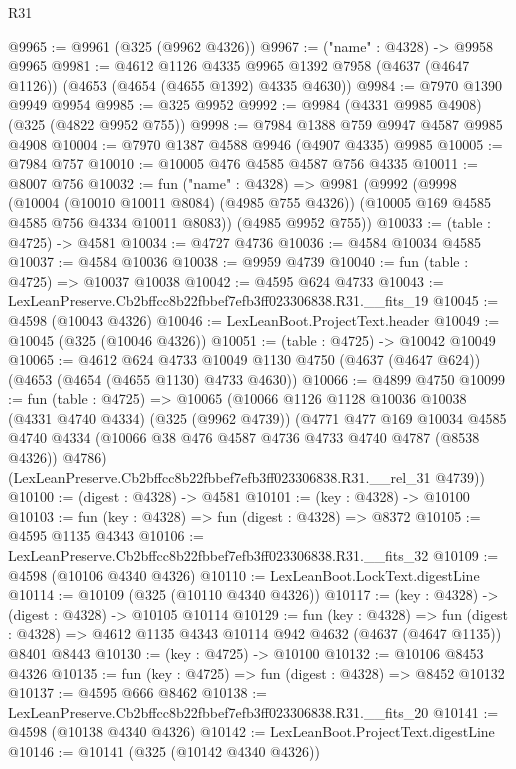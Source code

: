 \begin{lexlean}{R31}
\begin{coremodule}
@9965 := @9961 (@325 (@9962 @4326))
@9967 := ("name" : @4328) -> @9958 @9965
@9981 := @4612
    @1126
    @4335
    @9965
    @1392
    @7958
    (@4637 (@4647 @1126))
    (@4653 (@4654 (@4655 @1392) @4335 @4630))
@9984 := @7970 @1390 @9949 @9954
@9985 := @325 @9952
@9992 := @9984 (@4331 @9985 @4908) (@325 (@4822 @9952 @755))
@9998 := @7984 @1388 @759 @9947 @4587 @9985 @4908
@10004 := @7970 @1387 @4588 @9946 (@4907 @4335) @9985
@10005 := @7984 @757
@10010 := @10005 @476 @4585 @4587 @756 @4335
@10011 := @8007 @756
@10032 := fun ("name" : @4328) =>
  @9981
    (@9992
      (@9998
        (@10004 (@10010 @10011 @8084) (@4985 @755 @4326))
        (@10005 @169 @4585 @4585 @756 @4334 @10011 @8083))
      (@4985 @9952 @755))
@10033 := (table : @4725) -> @4581
@10034 := @4727 @4736
@10036 := @4584 @10034 @4585
@10037 := @4584 @10036
@10038 := @9959 @4739
@10040 := fun (table : @4725) => @10037 @10038
@10042 := @4595 @624 @4733
@10043 := LexLeanPreserve.Cb2bffcc8b22fbbef7efb3ff023306838.R31.__fits_19
@10045 := @4598 (@10043 @4326)
@10046 := LexLeanBoot.ProjectText.header
@10049 := @10045 (@325 (@10046 @4326))
@10051 := (table : @4725) -> @10042 @10049
@10065 := @4612
    @624
    @4733
    @10049
    @1130
    @4750
    (@4637 (@4647 @624))
    (@4653 (@4654 (@4655 @1130) @4733 @4630))
@10066 := @4899 @4750
@10099 := fun (table : @4725) =>
  @10065
    (@10066
      @1126
      @1128
      @10036
      @10038
      (@4331 @4740 @4334)
      (@325 (@9962 @4739))
      (@4771
        @477
        @169
        @10034
        @4585
        @4740
        @4334
        (@10066 @38 @476 @4587 @4736 @4733 @4740 @4787 (@8538 @4326))
        @4786)
      (LexLeanPreserve.Cb2bffcc8b22fbbef7efb3ff023306838.R31.__rel_31 @4739))
@10100 := (digest : @4328) -> @4581
@10101 := (key : @4328) -> @10100
@10103 := fun (key : @4328) => fun (digest : @4328) => @8372
@10105 := @4595 @1135 @4343
@10106 := LexLeanPreserve.Cb2bffcc8b22fbbef7efb3ff023306838.R31.__fits_32
@10109 := @4598 (@10106 @4340 @4326)
@10110 := LexLeanBoot.LockText.digestLine
@10114 := @10109 (@325 (@10110 @4340 @4326))
@10117 := (key : @4328) -> (digest : @4328) -> @10105 @10114
@10129 := fun (key : @4328) =>
  fun (digest : @4328) => @4612 @1135 @4343 @10114 @942 @4632 (@4637 (@4647 @1135)) @8401 @8443
@10130 := (key : @4725) -> @10100
@10132 := @10106 @8453 @4326
@10135 := fun (key : @4725) => fun (digest : @4328) => @8452 @10132
@10137 := @4595 @666 @8462
@10138 := LexLeanPreserve.Cb2bffcc8b22fbbef7efb3ff023306838.R31.__fits_20
@10141 := @4598 (@10138 @4340 @4326)
@10142 := LexLeanBoot.ProjectText.digestLine
@10146 := @10141 (@325 (@10142 @4340 @4326))

\end{coremodule}
\end{lexlean}
